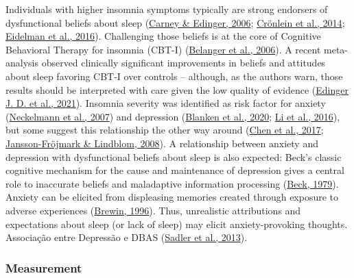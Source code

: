 \documentclass[
  ,doc,11pt, twoside,floatsintext]{apa6}
\begin{document}
Individuals with higher insomnia symptoms typically are strong endorsers of dysfunctional beliefs about sleep (\protect\hyperlink{ref-carney2006}{Carney \& Edinger, 2006}; \protect\hyperlink{ref-cronlein2014}{Crönlein et al., 2014}; \protect\hyperlink{ref-eidelman2016}{Eidelman et al., 2016}). Challenging those beliefs is at the core of Cognitive Behavioral Therapy for insomnia (CBT-I) (\protect\hyperlink{ref-belanger2006}{Belanger et al., 2006}). A recent meta-analysis observed clinically significant improvements in beliefs and attitudes about sleep favoring CBT-I over controls -- although, as the authors warn, those results should be interpreted with care given the low quality of evidence (\protect\hyperlink{ref-edingerjackd.2021}{Edinger J. D. et al., 2021}). Insomnia severity was identified as risk factor for anxiety (\protect\hyperlink{ref-neckelmann2007}{Neckelmann et al., 2007}) and depression (\protect\hyperlink{ref-blanken2020}{Blanken et al., 2020}; \protect\hyperlink{ref-li2016}{Li et al., 2016}), but some suggest this relationship the other way around (\protect\hyperlink{ref-chen2017}{Chen et al., 2017}; \protect\hyperlink{ref-jansson-frojmark2008b}{Jansson-Fröjmark \& Lindblom, 2008}). A relationship between anxiety and depression with dysfunctional beliefs about sleep is also expected: Beck's classic cognitive mechanism for the cause and maintenance of depression gives a central role to inaccurate beliefs and maladaptive information processing (\protect\hyperlink{ref-beck1979cognitive}{Beck, 1979}). Anxiety can be elicited from displeasing memories created through exposure to adverse experiences (\protect\hyperlink{ref-brewin1996theoretical}{Brewin, 1996}). Thus, unrealistic attributions and expectations about sleep (or lack of sleep) may elicit anxiety-provoking thoughts. Associação entre Depressão e DBAS (\protect\hyperlink{ref-sadler2013}{Sadler et al., 2013}).

\hypertarget{measurement}{%
\subsubsection{Measurement}\label{measurement}}
\end{document}
